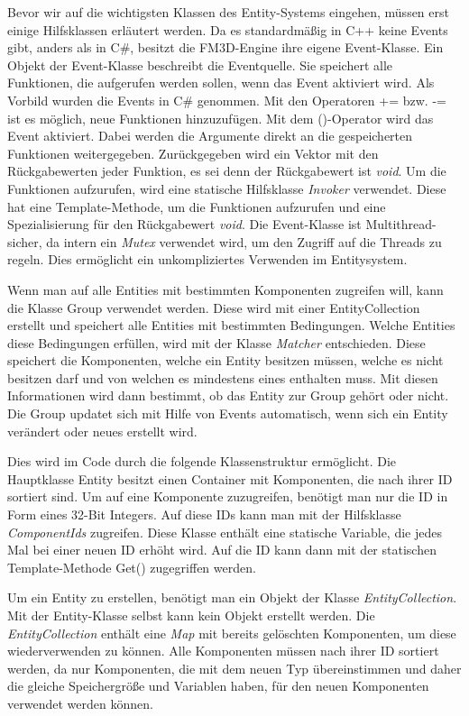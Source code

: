 Bevor wir auf die wichtigsten Klassen des Entity-Systems eingehen, müssen erst einige Hilfsklassen erläutert werden.
Da es standardmäßig in C++ keine Events gibt, anders als in C\#, besitzt die FM3D-Engine ihre eigene Event-Klasse. Ein Objekt der Event-Klasse beschreibt die Eventquelle. Sie speichert alle Funktionen, die aufgerufen werden sollen, wenn das Event aktiviert wird. Als Vorbild wurden die Events in C\# genommen. Mit den Operatoren += bzw. -= ist es möglich, neue Funktionen hinzuzufügen. Mit dem ()-Operator wird das Event aktiviert. Dabei werden die Argumente direkt an die gespeicherten Funktionen weitergegeben. Zurückgegeben wird ein Vektor mit den Rückgabewerten jeder Funktion, es sei denn der Rückgabewert ist \textit{void}. Um die Funktionen aufzurufen, wird eine statische Hilfsklasse \textit{Invoker} verwendet. Diese hat eine Template-Methode, um die Funktionen aufzurufen und eine Spezialisierung für den Rückgabewert \textit{void}. Die Event-Klasse ist Multithread-sicher, da intern ein \textit{Mutex} verwendet wird, um den Zugriff auf die Threads zu regeln. Dies ermöglicht ein %
unkompliziertes Verwenden im Entitysystem.

Wenn man auf alle Entities mit bestimmten Komponenten zugreifen will, kann die Klasse Group verwendet werden. Diese wird mit einer EntityCollection erstellt und speichert alle Entities mit bestimmten Bedingungen. Welche Entities diese Bedingungen erfüllen, wird mit der Klasse \textit{Matcher} entschieden. Diese speichert die Komponenten, welche ein Entity besitzen müssen, welche es nicht besitzen darf und von welchen es mindestens eines enthalten muss. Mit diesen Informationen wird dann bestimmt, ob das Entity zur Group gehört oder nicht. Die Group updatet sich mit Hilfe von Events automatisch, wenn sich ein Entity verändert oder neues erstellt wird.

Dies wird im Code durch die folgende Klassenstruktur ermöglicht. Die Hauptklasse Entity besitzt einen Container mit Komponenten, die nach ihrer ID sortiert sind. Um auf eine Komponente zuzugreifen, benötigt man nur die ID in Form eines 32-Bit Integers. Auf diese IDs kann man mit der Hilfsklasse \textit{ComponentIds} zugreifen. 
Diese Klasse enthält eine statische Variable, die jedes Mal bei einer neuen ID erhöht wird. Auf die ID kann dann mit der statischen Template-Methode Get() zugegriffen werden.
 
Um ein Entity zu erstellen, benötigt man ein Objekt der Klasse \textit{EntityCollection}. Mit der Entity-Klasse selbst kann kein Objekt erstellt werden.
Die \textit{EntityCollection} enthält eine \textit{Map} mit bereits gelöschten Komponenten, um diese wiederverwenden zu können. 
Alle Komponenten müssen nach ihrer ID sortiert werden, da nur Komponenten, die mit dem neuen Typ übereinstimmen und daher die gleiche Speichergröße und Variablen haben, für den neuen Komponenten verwendet werden können.

